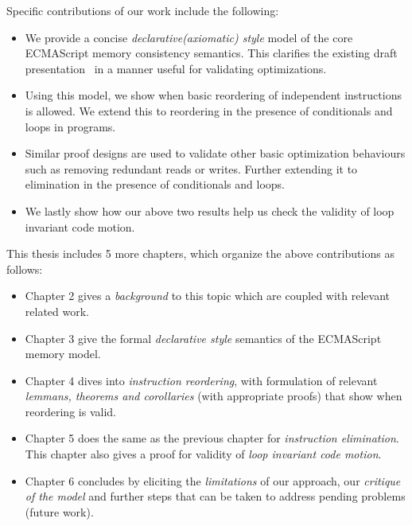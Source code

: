 Specific contributions of our work include the following:
\begin{itemize}
    \item We provide a concise \textit{declarative(axiomatic) style} model of the core ECMAScript memory consistency semantics. This clarifies the existing draft presentation~\cite{ECMA} in a manner useful for validating optimizations.
    \item Using this model, we show when basic reordering of independent instructions is allowed. We extend this to reordering in the presence of conditionals and loops in programs.
    \item Similar proof designs are used to validate other basic optimization behaviours such as removing redundant reads or writes. Further extending it to elimination in the presence of conditionals and loops. 
    \item We lastly show how our above two results help us check the validity of loop invariant code motion. 
\end{itemize}

This thesis includes 5 more chapters, which organize the above contributions as follows:
\begin{itemize}
    \item Chapter 2 gives a \textit{background} to this topic which are coupled with relevant related work.
    \item Chapter 3 give the formal \textit{declarative style} semantics of the ECMAScript memory model.
    \item Chapter 4 dives into \textit{instruction reordering}, with formulation of relevant \textit{lemmans, theorems and corollaries} (with appropriate proofs) that show when reordering is valid.
    \item Chapter 5 does the same as the previous chapter for \textit{instruction elimination}. This chapter also gives a proof for validity of \textit{loop invariant code motion}. 
    \item Chapter 6 concludes by eliciting the \textit{limitations} of our approach, our \textit{critique of the model} and further steps that can be taken to address pending problems (future work).
\end{itemize}